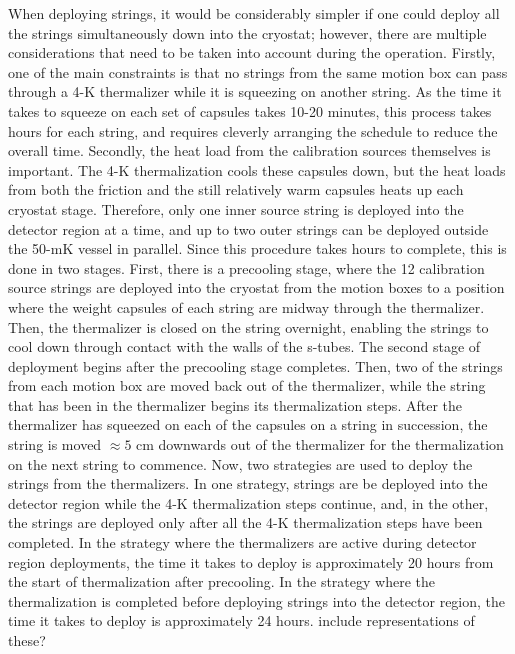 When deploying strings, it would be considerably simpler if one could deploy all the strings simultaneously down into the cryostat; however, there are multiple considerations that need to be taken into account during the operation.
Firstly, one of the main constraints is that no strings from the same motion box can pass through a 4-K thermalizer while it is squeezing on another string.
As the time it takes to squeeze on each set of capsules takes 10-20 minutes, this process takes hours for each string, and requires cleverly arranging the schedule to reduce the overall time.
Secondly, the heat load from the calibration sources themselves is important.
The 4-K thermalization cools these capsules down, but the heat loads from both the friction and the still relatively warm capsules heats up each cryostat stage.
Therefore, only one inner source string is deployed into the detector region at a time, and up to two outer strings can be deployed outside the 50-mK vessel in parallel.
Since this procedure takes hours to complete, this is done in two stages.
First, there is a precooling stage, where the 12 calibration source strings are deployed into the cryostat from the motion boxes to a position where the weight capsules of each string are midway through the thermalizer.
Then, the thermalizer is closed on the string overnight, enabling the strings to cool down through contact with the walls of the s-tubes.
The second stage of deployment begins after the precooling stage completes. Then, two of the strings from each motion box are moved back out of the thermalizer, while the string that has been in the thermalizer begins its thermalization steps.
After the thermalizer has squeezed on each of the capsules on a string in succession, the string is moved $\approx5$ cm downwards out of the thermalizer for the thermalization on the next string to commence.
Now, two strategies are used to deploy the strings from the thermalizers.
In one strategy, strings are be deployed into the detector region while the 4-K thermalization steps continue, and, in the other, the strings are deployed only after all the 4-K thermalization steps have been completed.
In the strategy where the thermalizers are active during detector region deployments, the time it takes to deploy is approximately 20 hours from the start of thermalization after precooling.
In the strategy where the thermalization is completed before deploying strings into the detector region, the time it takes to deploy is approximately 24 hours.
\color{red} include representations of these?\color{black}

